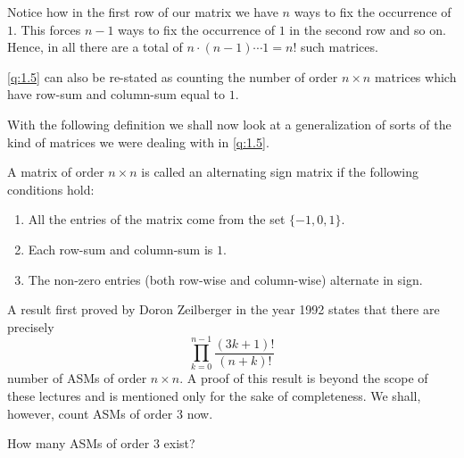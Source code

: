\begin{solution}
Notice how in the first row of our matrix we have $n$ ways to fix the occurrence of $1$. This forces $n-1$ ways to fix the occurrence of $1$ in the second row and so on. Hence, in all there are a total of $n\cdot \left( n-1 \right) \cdots 1 = n!$ such matrices.
\end{solution}
\begin{remark}
\cref{q:1.5} can also be re-stated as counting the number of order $n\times n$ matrices which have row-sum and column-sum equal to $1$.    
\end{remark}
With the following definition we shall now look at a generalization of sorts of the kind of matrices we were dealing with in \cref{q:1.5}.
\begin{definition}
	A matrix of order $n\times n$ is called an alternating sign matrix if the following conditions hold:
	\begin{enumerate}
		\item All the entries of the matrix come from the set $\{-1,0,1\}$.
		\item Each row-sum and column-sum is $1$.
		\item The non-zero entries (both row-wise and column-wise) alternate in sign.
	\end{enumerate}
\end{definition}
A result first proved by Doron Zeilberger in the year 1992 states that there are precisely  \[
\prod_{k=0}^{n-1} \frac{\left( 3k+1 \right)!}{\left( n+k \right)!}
\] 
number of ASMs of order $n\times n$. A proof of this result is beyond the scope of these lectures and is mentioned only for the sake of completeness. We shall, however, count ASMs of order $3$ now.
\begin{question}
    How many ASMs of order $3$ exist?
    \label{q:1.6}
\end{question}
